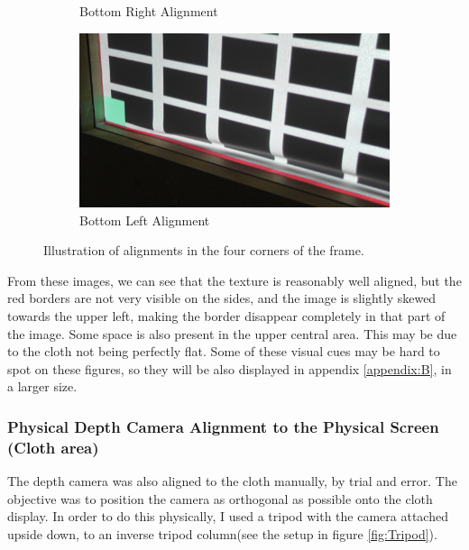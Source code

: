 \documentclass[]{article}
\begin{document}
\begin{figure}[hbtp]
\begin{subfigure}[b]{0.5\linewidth}
    \caption{Bottom Right Alignment} 
    \label{fig7:BRA} 
  \end{subfigure}%
  \begin{subfigure}[b]{0.5\linewidth}
    \centering
    \includegraphics[width=0.75\linewidth]{figures/BottomLeft2.JPG} 
    \caption{Bottom Left Alignment} 
    \label{fig7:BLA} 
  \end{subfigure} 
  \caption{Illustration of alignments in the four corners of the frame.}
  \label{fig:CornerAlignment} 
\end{figure}

 From these images, we can see that the texture is reasonably well aligned, but the red borders are not very visible on the sides, and the image is slightly skewed towards the upper left, making the border disappear completely in that part of the image. Some space is also present in the upper central area. This may be due to the cloth not being perfectly flat. Some of these visual cues may be hard to spot on these figures, so they will be also displayed in appendix \ref{appendix:B}, in a larger size.

\subsubsection{Physical Depth Camera Alignment to the Physical Screen (Cloth area)}

The depth camera was also aligned to the cloth manually, by trial and error. The objective was to position the camera as orthogonal as possible onto the cloth display. In order to do this physically, I used a tripod with the camera attached upside down, to an inverse tripod column(see the setup in figure \ref{fig:Tripod}). 
\end{document}
